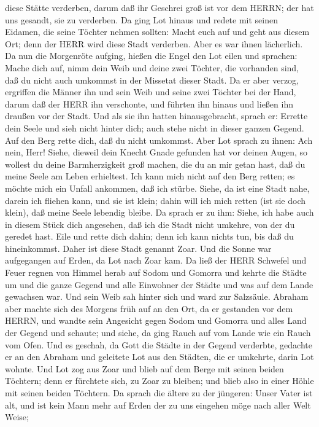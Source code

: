 diese Stätte verderben, darum daß ihr Geschrei groß ist vor dem HERRN;
der hat uns gesandt, sie zu verderben.  Da ging Lot hinaus
und redete mit seinen Eidamen, die seine Töchter nehmen sollten: Macht
euch auf und geht aus diesem Ort; denn der HERR wird diese Stadt
verderben. Aber es war ihnen lächerlich.  Da nun die
Morgenröte aufging, hießen die Engel den Lot eilen und sprachen: Mache
dich auf, nimm dein Weib und deine zwei Töchter, die vorhanden sind, daß
du nicht auch umkommst in der Missetat dieser Stadt.  Da er
aber verzog, ergriffen die Männer ihn und sein Weib und seine zwei
Töchter bei der Hand, darum daß der HERR ihn verschonte, und führten ihn
hinaus und ließen ihn draußen vor der Stadt.  Und als sie
ihn hatten hinausgebracht, sprach er: Errette dein Seele und sieh nicht
hinter dich; auch stehe nicht in dieser ganzen Gegend. Auf den Berg
rette dich, daß du nicht umkommst.  Aber Lot sprach zu
ihnen: Ach nein, Herr!  Siehe, dieweil dein Knecht Gnade
gefunden hat vor deinen Augen, so wollest du deine Barmherzigkeit groß
machen, die du an mir getan hast, daß du meine Seele am Leben
erhieltest. Ich kann mich nicht auf den Berg retten; es möchte mich ein
Unfall ankommen, daß ich stürbe.  Siehe, da ist eine Stadt
nahe, darein ich fliehen kann, und sie ist klein; dahin will ich mich
retten (ist sie doch klein), daß meine Seele lebendig bleibe.
 Da sprach er zu ihm: Siehe, ich habe auch in diesem Stück
dich angesehen, daß ich die Stadt nicht umkehre, von der du geredet
hast.  Eile und rette dich dahin; denn ich kann nichts tun,
bis daß du hineinkommst. Daher ist diese Stadt genannt Zoar.
 Und die Sonne war aufgegangen auf Erden, da Lot nach Zoar
kam.  Da ließ der HERR Schwefel und Feuer regnen von Himmel
herab auf Sodom und Gomorra  und kehrte die Städte um und
die ganze Gegend und alle Einwohner der Städte und was auf dem Lande
gewachsen war.  Und sein Weib sah hinter sich und ward zur
Salzsäule.  Abraham aber machte sich des Morgens früh auf
an den Ort, da er gestanden vor dem HERRN,  und wandte sein
Angesicht gegen Sodom und Gomorra und alles Land der Gegend und schaute;
und siehe, da ging Rauch auf vom Lande wie ein Rauch vom Ofen.
 Und es geschah, da Gott die Städte in der Gegend
verderbte, gedachte er an den Abraham und geleitete Lot aus den Städten,
die er umkehrte, darin Lot wohnte.  Und Lot zog aus Zoar
und blieb auf dem Berge mit seinen beiden Töchtern; denn er fürchtete
sich, zu Zoar zu bleiben; und blieb also in einer Höhle mit seinen
beiden Töchtern.  Da sprach die ältere zu der jüngeren:
Unser Vater ist alt, und ist kein Mann mehr auf Erden der zu uns
eingehen möge nach aller Welt Weise;

